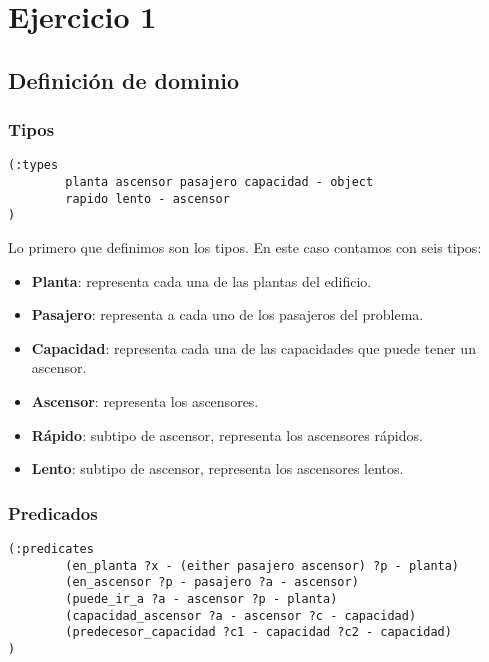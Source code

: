 \documentclass{article}
\begin{document}
\section{Ejercicio 1}

\subsection{Definición de dominio}
\subsubsection{Tipos}
\begin{verbatim}
(:types
        planta ascensor pasajero capacidad - object
        rapido lento - ascensor
)
\end{verbatim}

Lo primero que definimos son los tipos. En este caso contamos con seis tipos:
\begin{itemize}
    \item \textbf{Planta}: representa cada una de las plantas del edificio.
    \item \textbf{Pasajero}: representa a cada uno de los pasajeros del problema.
    \item \textbf{Capacidad}: representa cada una de las capacidades que puede tener un ascensor.
    \item \textbf{Ascensor}: representa los ascensores.
    \item \textbf{Rápido}: subtipo de ascensor, representa los ascensores rápidos.
    \item \textbf{Lento}: subtipo de ascensor, representa los ascensores lentos.
\end{itemize}

\subsubsection{Predicados}
\begin{verbatim}
(:predicates
        (en_planta ?x - (either pasajero ascensor) ?p - planta)
        (en_ascensor ?p - pasajero ?a - ascensor)
        (puede_ir_a ?a - ascensor ?p - planta)
        (capacidad_ascensor ?a - ascensor ?c - capacidad)
        (predecesor_capacidad ?c1 - capacidad ?c2 - capacidad)
)
\end{verbatim}
\end{document}
